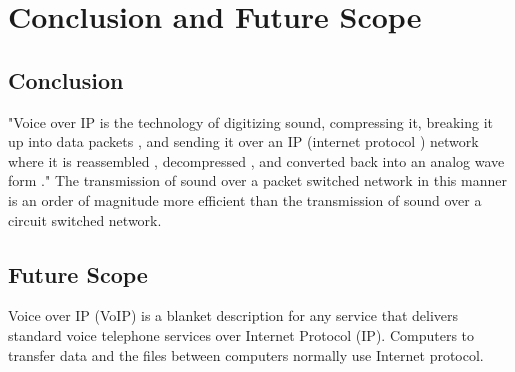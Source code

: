 \chapter{Conclusion and Future Scope}

\section{Conclusion}
\justify
\quad
"Voice over IP is the technology of digitizing sound, compressing it, breaking it up into data packets , and sending it over an IP (internet protocol ) network where it is reassembled , decompressed , and converted back into an analog wave form ." The transmission of sound over a packet switched network in this manner is an order of magnitude more efficient than the transmission of sound over a circuit switched network.

\section{Future Scope}
\justify
\quad
Voice over IP (VoIP) is a blanket description for any service that delivers standard voice telephone services over Internet Protocol (IP). Computers to transfer data and the files between computers normally use Internet protocol.
\newpage